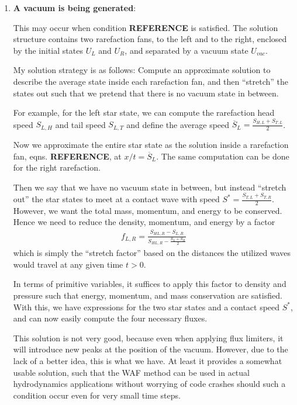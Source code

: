 \begin{enumerate}
	
	\item 	\textbf{A vacuum is being generated}:
	
			This may occur when condition \textbf{REFERENCE} is satisfied.
			The solution structure contains two rarefaction fans, to the left and to the right, enclosed by the initial states $U_L$ and $U_R$, and separated by a vacuum state $U_{vac}$.
			
			My solution strategy is as follows:
			Compute an approximate solution to describe the average state inside each rarefaction fan, and then ``stretch'' the states out such that we pretend that there is no vacuum state in between.
			
			For example, for the left star state, we can compute the rarefaction head speed $S_{L,H}$ and tail speed $S_{L,T}$ and define the average speed $\overline{S}_L = \frac{S_{H,L} + S_{T,L}}{2}$.
			
			Now we approximate the entire star state as the solution inside a rarefaction fan, eqns. \textbf{REFERENCE}, at $x/t = \overline{S}_L$.
			The same computation can be done for the right rarefaction.
			
			Then we say that we have no vacuum state in between, but instead ``stretch out'' the star states to meet at a contact wave with speed $S^* = \frac{S_{T,L} + S_{T,R}}{2}$.
			However, we want the total mass, momentum, and energy to be conserved.
			Hence we need to reduce the density, momentum, and energy by a factor
			\begin{align*}
				f_{L,R} = \frac{S_{HL,R} - S_{L,R}}{S_{HL,R} - \frac{S_L + S_R}{2}}
			\end{align*}
			which is simply the ``stretch factor'' based on the distances the utilized waves would travel at any given time $t > 0 $.
			
			In terms of primitive variables, it suffices to apply this factor to density and pressure such that energy, momentum, and mass conservation are satisfied.
			With this, we have expressions for the two star states and a contact speed $S^*$, and can now easily compute the four necessary fluxes.
			
			This solution is not very good, because even when applying flux limiters, it will introduce new peaks at the position of the vacuum.
			However, due to the lack of a better idea, this is what we have.
			At least it provides a somewhat usable solution, such that the WAF method can be used in actual hydrodynamics applications without worrying of code crashes should such a condition occur even for very small time steps.
			

\end{enumerate}
























